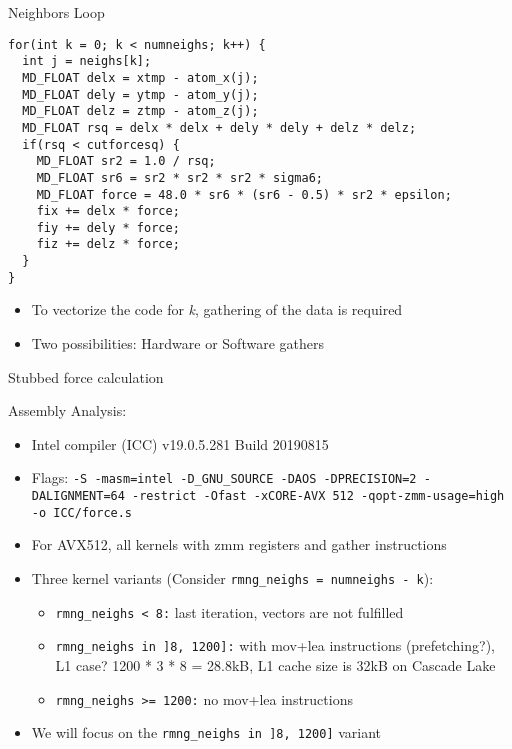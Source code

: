 \documentclass[aspectratio=43,t]{beamer}
\begin{document}
  \begin{frame}[fragile]{Neighbors Loop}
    \begin{lstlisting}
for(int k = 0; k < numneighs; k++) {
  int j = neighs[k];
  MD_FLOAT delx = xtmp - atom_x(j);
  MD_FLOAT dely = ytmp - atom_y(j);
  MD_FLOAT delz = ztmp - atom_z(j);
  MD_FLOAT rsq = delx * delx + dely * dely + delz * delz;
  if(rsq < cutforcesq) {
    MD_FLOAT sr2 = 1.0 / rsq;
    MD_FLOAT sr6 = sr2 * sr2 * sr2 * sigma6;
    MD_FLOAT force = 48.0 * sr6 * (sr6 - 0.5) * sr2 * epsilon;
    fix += delx * force;
    fiy += dely * force;
    fiz += delz * force;
  }
}
    \end{lstlisting}
    \begin{itemize}
      \item To vectorize the code for \emph{k}, gathering of the data is required
      \item Two possibilities: Hardware or Software gathers
    \end{itemize}
  \end{frame}

  \begin{frame}[fragile]{Stubbed force calculation}
  \end{frame}

  \begin{frame}[fragile]{Assembly Analysis:}
    \begin{itemize}
      \item Intel compiler (ICC) v19.0.5.281 Build 20190815
      \item Flags: \texttt{-S -masm=intel -D\_GNU\_SOURCE -DAOS -DPRECISION=2 -DALIGNMENT=64 -restrict -Ofast -xCORE-AVX 512 -qopt-zmm-usage=high -o ICC/force.s}
      \item For AVX512, all kernels with zmm registers and gather instructions
      \item Three kernel variants (Consider \texttt{rmng\_neighs = numneighs - k}):
      \begin{itemize}
        \item \texttt{rmng\_neighs < 8:} last iteration, vectors are not fulfilled
        \item \texttt{rmng\_neighs in ]8, 1200]:} with mov+lea instructions (prefetching?), L1 case? 1200 * 3 * 8 = 28.8kB, L1 cache size is 32kB on Cascade Lake
        \item \texttt{rmng\_neighs >= 1200:} no mov+lea instructions
      \end{itemize}
      \item We will focus on the \texttt{rmng\_neighs in ]8, 1200]} variant
    \end{itemize}
  \end{frame}
\end{document}
